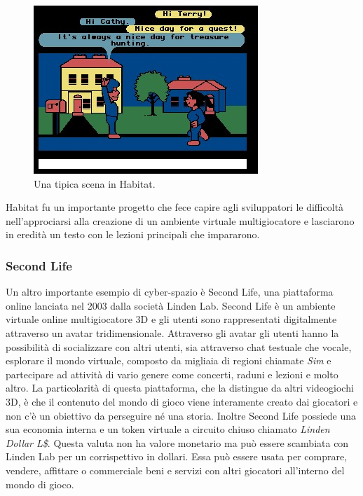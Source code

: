         \begin{figure}[!ht]
            \centering
            \includegraphics[width=.9\textwidth]{figure/lessonshabitat.jpg}
            \caption{Una tipica scena in Habitat.}
        \end{figure}

        Habitat fu un importante progetto che fece capire agli sviluppatori le difficoltà nell'approciarsi alla creazione di un ambiente virtuale multigiocatore e lasciarono in eredità un testo con le lezioni principali che impararono. \cite{Habitat1990}
         
        \subsubsection{Second Life}

        Un altro importante esempio di cyber-spazio è Second Life, una piattaforma online lanciata nel 2003 dalla società Linden Lab.
        Second Life è un ambiente virtuale online multigiocatore 3D e  gli utenti sono rappresentati digitalmente attraverso un avatar tridimensionale.
        Attraverso gli avatar gli utenti hanno la possibilità di socializzare con altri utenti, sia attraverso chat testuale che vocale, esplorare il mondo virtuale, composto da migliaia di regioni chiamate \textit{Sim} e partecipare ad attività di vario genere come concerti, raduni e lezioni e molto altro.
        La particolarità di questa piattaforma, che la distingue da altri videogiochi 3D, è che il contenuto del mondo di gioco viene interamente creato dai giocatori e non c'è un obiettivo da perseguire né una storia.
        Inoltre Second Life possiede una sua economia interna e un token virtuale a circuito chiuso chiamato \textit{Linden Dollar L\$}. 
        Questa valuta non ha valore monetario ma può essere scambiata con Linden Lab per un corrispettivo in dollari.
        Essa può essere usata per comprare, vendere, affittare o commerciale beni e servizi con altri giocatori all'interno del mondo di gioco.
        

